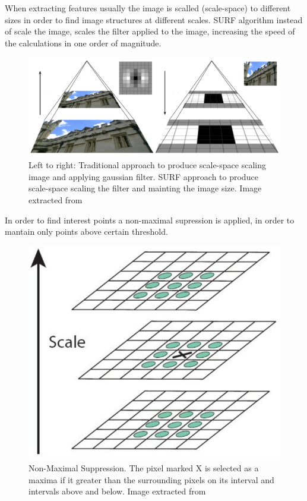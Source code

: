 When extracting features usually the image is scalled (scale-space) to different sizes in order 
to find image structures 
at different scales. SURF algorithm instead of scale the image, scales the filter applied to the 
image, increasing the speed of the calculations in one order of magnitude.

\begin{figure}[!h]
\begin{center}
\includegraphics[scale=0.35]{images/surf_scale}
\caption{Left to right: Traditional approach to produce scale-space scaling image and applying gaussian filter. SURF approach to produce scale-space scaling the filter and mainting the image size. Image extracted from \cite{miguel}}
\end{center}
\end{figure}


In order to find interest points a non-maximal supression is applied, in order to mantain only points above certain threshold. 

\begin{figure}[H]
\begin{center}
\includegraphics[scale=0.28]{images/surf_nb}
\caption{Non-Maximal Suppression. The pixel marked X is selected as a maxima if it greater than the 
surrounding pixels on its interval and intervals above and below. Image extracted from \cite{OpenSURF}}
\end{center}
\end{figure}

